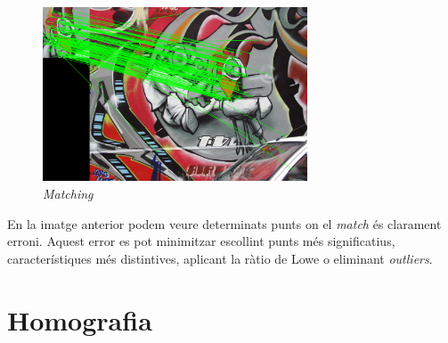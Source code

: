 	\begin{figure}[H]
		\centering
		\includegraphics[width=0.7\textwidth]{images/matching}
		\caption{\textit{Matching}}
	\end{figure}
\noindent
	En la imatge anterior podem veure determinats punts on el \textit{match} és clarament erroni. Aquest error es pot minimitzar escollint punts més significatius, característiques més distintives, aplicant
	la ràtio de Lowe o eliminant \textit{outliers}.

\section{Homografia}

